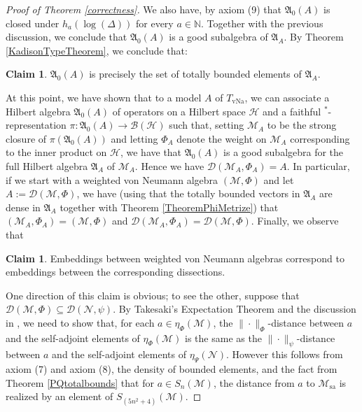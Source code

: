 \documentclass[12pt]{amsart}
\theoremstyle{definition}
\newtheorem{claim}[thm]{Claim}
\def\cal{\mathcal}
\DeclareMathOperator{\vNa}{vNa}
\def \sa{\operatorname{sa}}
\def \bbN{\mathbb{N}}
\begin{document}
\begin{proof}[Proof of Theorem \ref{correctness}]
    We also have, by axiom (9) that $\mathfrak{A}_0(A)$ is closed under $h_{a}(\log(\Delta))$ for every $a \in \bbN$.  Together with the previous discussion, we conclude that $\mathfrak{A}_0(A)$ is a good subalgebra of $\mathfrak{A}_{A}$. By Theorem \ref{KadisonTypeTheorem}, we conclude that:
    \begin{claim}
        $\mathfrak{A}_0(A)$ is precisely the set of totally bounded elements of $\mathfrak{A}_{A}$.
    \end{claim}

    At this point, we have shown that to a model $A$ of $T_{\vNa}$, we can associate a Hilbert algebra $\mathfrak{A}_0(A)$ of operators on a Hilbert space $\cal H$ and a faithful $^*$-representation $\pi: \mathfrak{A}_0(A) \to \cal B(\cal H)$ such that, setting $\cal M_A$ to be the strong closure of $\pi(\mathfrak{A}_0(A))$ and letting $\Phi_A$ denote the weight on $\cal M_A$ corresponding to the inner product on $\cal H$, we have that $\mathfrak{A}_0(A)$ is a good subalgebra for the full Hilbert algebra $\mathfrak{A}_{A}$ of $\cal M_A$.  Hence we have $\cal D(\cal M_A, \Phi_A)=A$.  In particular, if we start with a weighted von Neumann algebra $(\cal M, \Phi)$ and let $A := \cal D(\cal M, \Phi)$, we have (using that the totally bounded vectors in $\mathfrak{A}_{A}$ are dense in $\mathfrak{A}_{A}$ together with Theorem \ref{TheoremPhiMetrize}) that $(\cal M_A, \Phi_A)=(\cal M, \Phi)$ and $\cal D(\cal M_A,\Phi_A) = \cal D(\cal M,\Phi)$.  Finally, we observe that

    \begin{claim}
        Embeddings between weighted von Neumann algebras correspond to embeddings between the corresponding dissections.
    \end{claim}
    One direction of this claim is obvious; to see the other, suppose that $\cal D(\cal M,\Phi)\subseteq \cal D(\cal N,\psi)$.  By Takesaki's Expectation Theorem and the discussion in \cite{RvD}, we need to show that, for each $a \in \eta_{\Phi}(\cal M)$, the $\|\cdot\|_\Phi$-distance between $a$ and the self-adjoint elements of $\eta_{\Phi}(\cal M)$ is the same as the $\|\cdot\|_\psi$-distance between $a$ and the self-adjoint elements of $\eta_{\Psi}(\cal N)$.  However this follows from axiom (7) and axiom (8), the density of bounded elements, and the fact from Theorem \ref{PQtotalbounds} that for $a \in S_n(\cal M)$, the distance from $a$ to $\cal M_{\sa}$ is realized by an element of $S_{(5n^2+4)}(\cal M)$.
\end{proof}
\end{document}
